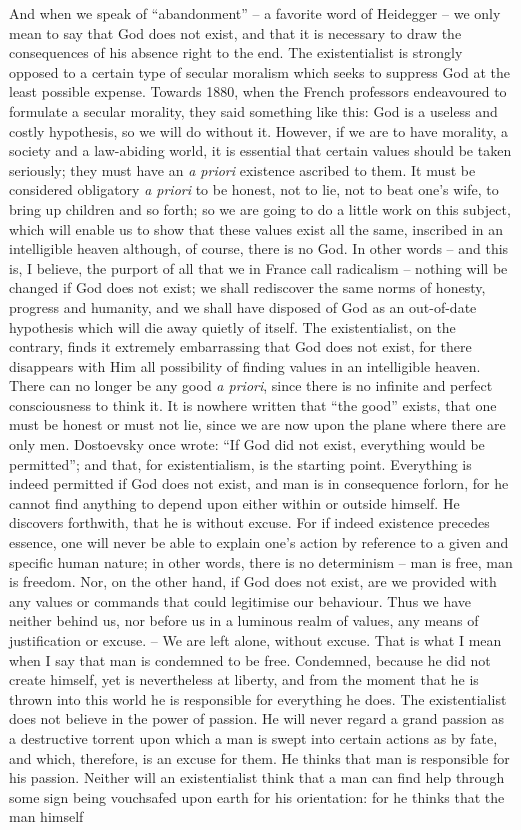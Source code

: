 \documentclass[12pt]{article}
\begin{document}
And when we speak of “abandonment” – a favorite word of Heidegger – we only mean to say that God does not exist, and that it is necessary to draw the consequences of his absence right to the end. The existentialist is strongly opposed to a certain type of secular moralism which seeks to suppress God at the least possible expense. Towards 1880, when the French professors endeavoured to formulate a secular morality, they said something like this: God is a useless and costly hypothesis, so we will do without it. However, if we are to have morality, a society and a law-abiding world, it is essential that certain values should be taken seriously; they must have an \textit{a priori} existence ascribed to them. It must be considered obligatory \textit{a priori} to be honest, not to lie, not to beat one’s wife, to bring up children and so forth; so we are going to do a little work on this subject, which will enable us to show that these values exist all the same, inscribed in an intelligible heaven although, of course, there is no God. In other words – and this is, I believe, the purport of all that we in France call radicalism – nothing will be changed if God does not exist; we shall rediscover the same norms of honesty, progress and humanity, and we shall have disposed of God as an out-of-date hypothesis which will die away quietly of itself. The existentialist, on the contrary, finds it extremely embarrassing that God does not exist, for there disappears with Him all possibility of finding values in an intelligible heaven. There can no longer be any good \textit{a priori}, since there is no infinite and perfect consciousness to think it. It is nowhere written that “the good” exists, that one must be honest or must not lie, since we are now upon the plane where there are only men. Dostoevsky once wrote: “If God did not exist, everything would be permitted”; and that, for existentialism, is the starting point. Everything is indeed permitted if God does not exist, and man is in consequence forlorn, for he cannot find anything to depend upon either within or outside himself. He discovers forthwith, that he is without excuse. For if indeed existence precedes essence, one will never be able to explain one’s action by reference to a given and specific human nature; in other words, there is no determinism – man is free, man is freedom. Nor, on the other hand, if God does not exist, are we provided with any values or commands that could legitimise our behaviour. Thus we have neither behind us, nor before us in a luminous realm of values, any means of justification or excuse. – We are left alone, without excuse. That is what I mean when I say that man is condemned to be free. Condemned, because he did not create himself, yet is nevertheless at liberty, and from the moment that he is thrown into this world he is responsible for everything he does. The existentialist does not believe in the power of passion. He will never regard a grand passion as a destructive torrent upon which a man is swept into certain actions as by fate, and which, therefore, is an excuse for them. He thinks that man is responsible for his passion. Neither will an existentialist think that a man can find help through some sign being vouchsafed upon earth for his orientation: for he thinks that the man himself 
\end{document}
